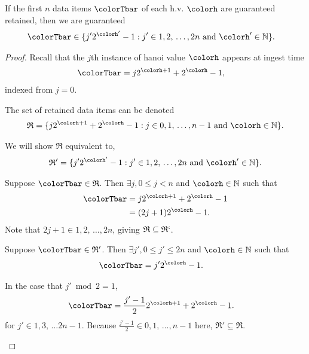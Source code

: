 \begin{lemma}
\label{thm:retained-equivalence-stretched}
If the first $n$ data items $\colorTbar$ of each h.v. $\colorh$ are guaranteed retained, then we are guaranteed 
\begin{align*}
\colorTbar
&\in
\{
  j'2^{\colorh'} - 1
  :
  j' \in 1,2,\,\ldots,2n
  \text{ and }
  \colorh' \in \mathbb{N}
\}.
\end{align*}
\end{lemma}
\begin{proof}

Recall that the $j$th instance of hanoi value $\colorh$ appears at ingest time 
\begin{align*}
\colorTbar
&= j2^{\colorh + 1} + 2^{\colorh} - 1,
\end{align*}
indexed from $j=0$.

The set of retained data items can be denoted
\begin{align*}
\mathfrak{R} =
\{
  j2^{\colorh + 1} + 2^{\colorh} - 1
  :
  j \in 0,1,\,\ldots,n-1
  \text{ and }
  \colorh \in \mathbb{N}
\}.
\end{align*}

We will show $\mathfrak{R}$ equivalent to,
\begin{align*}
\mathfrak{R}' =
\{
  j'2^{\colorh'} - 1
  :
  j' \in 1,2,\,\ldots,2n
  \text{ and }
  \colorh' \in \mathbb{N}
\}.
\end{align*}

\begin{proofpart}
Suppose $\colorTbar \in \mathfrak{R}$.
Then $\exists j,  0 \leq j < n$ and $\colorh \in \mathbb{N}$ such that
\begin{align*}
\colorTbar
&= j2^{\colorh + 1} + 2^{\colorh} - 1\\
&= (2j + 1)2^{\colorh} - 1.
\end{align*}
Note that $2j + 1 \in 1,2,\,\ldots,2n$, giving $\mathfrak{R} \subseteq \mathfrak{R}`$.
\end{proofpart}

\begin{proofpart}
Suppose $\colorTbar \in \mathfrak{R}'$.
Then $\exists j',  0 \leq j' \leq 2n$ and $\colorh \in \mathbb{N}$ such that
\begin{align*}
\colorTbar
&= j'2^{\colorh} - 1.
\end{align*}

In the case that $j' \bmod 2 = 1$, 
\begin{align*}
\colorTbar
&= \frac{j'-1}{2} 2^{\colorh + 1} + 2^{\colorh} - 1.
\end{align*}
for $j' \in 1, 3, \,\ldots 2n-1$.
Because $\frac{j'-1}{2} \in 0, 1, \, \ldots, n - 1$ here, $\mathfrak{R}' \subseteq \mathfrak{R}$.


\end{proofpart}
\end{proof}
